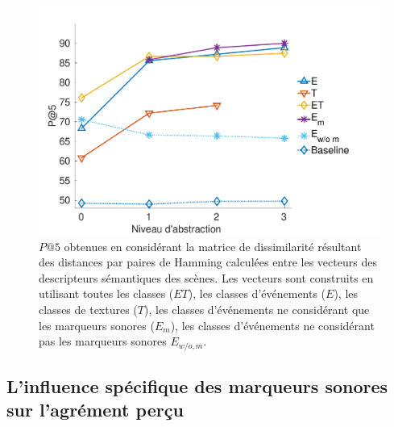 \begin{figure}[t]
        \myfloatalign
        \includegraphics[width=.8\linewidth]{gfx/ch_5/pa5_1}
       \caption[$P@5$ obtenues en considérant la matrice de dissimilarité résultant des distances par paires de Hamming calculées entre les vecteurs des descripteurs sémantiques des scènes.]{$P@5$ obtenues en considérant la matrice de dissimilarité résultant des distances par paires de Hamming calculées entre les vecteurs des descripteurs sémantiques des scènes. Les vecteurs sont construits en utilisant toutes les classes ($ET$), les classes d'événements ($E$), les classes de textures ($T$), les classes d'événements ne considérant que les marqueurs sonores ($E_m$), les classes d'événements ne considérant pas les marqueurs sonores $E_{w/o,m}$.}\label{fig:pa5}
\end{figure}

\subsection{L'influence spécifique des marqueurs sonores sur l'agrément perçu}

